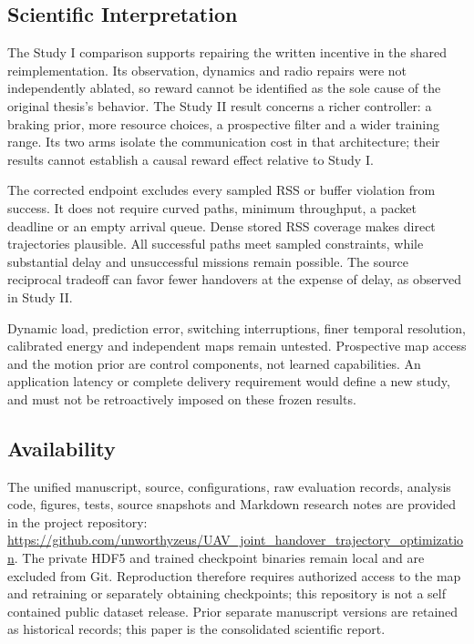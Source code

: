 \documentclass[conference]{IEEEtran}
\begin{document}
\subsection{Scientific Interpretation}
The Study I comparison supports repairing the written incentive in the shared
reimplementation. Its observation, dynamics and radio repairs were not
independently ablated, so reward cannot be identified as the sole cause of the
original thesis's behavior. The Study II result concerns a richer controller:
a braking prior, more resource choices, a prospective filter and a wider training
range. Its two arms isolate the communication cost in that architecture; their
results cannot establish a causal reward effect relative to Study I.

The corrected endpoint excludes every sampled RSS or buffer violation from
success. It does not require curved paths, minimum throughput, a packet deadline
or an empty arrival queue. Dense stored RSS coverage makes direct trajectories
plausible. All successful paths meet sampled constraints, while substantial
delay and unsuccessful missions remain possible. The source reciprocal tradeoff
can favor fewer handovers at the expense of delay, as observed in Study II.

Dynamic load, prediction error, switching interruptions, finer temporal
resolution, calibrated energy and independent maps remain untested. Prospective
map access and the motion prior are control components, not learned capabilities.
An application latency or complete delivery requirement would define a new
study, and must not be retroactively imposed on these frozen results.

\balance
\subsection{Availability}
The unified manuscript, source, configurations, raw evaluation records,
analysis code, figures, tests, source snapshots and Markdown research notes are
provided in the project repository:\\
\url{https://github.com/unworthyzeus/UAV_joint_handover_trajectory_optimization}.
The private HDF5 and trained checkpoint binaries remain local and are excluded
from Git. Reproduction therefore requires authorized access to the map and
retraining or separately obtaining checkpoints; this repository is not a
self contained public dataset release. Prior separate manuscript versions are
retained as historical records; this paper is the consolidated scientific report.
\end{document}
